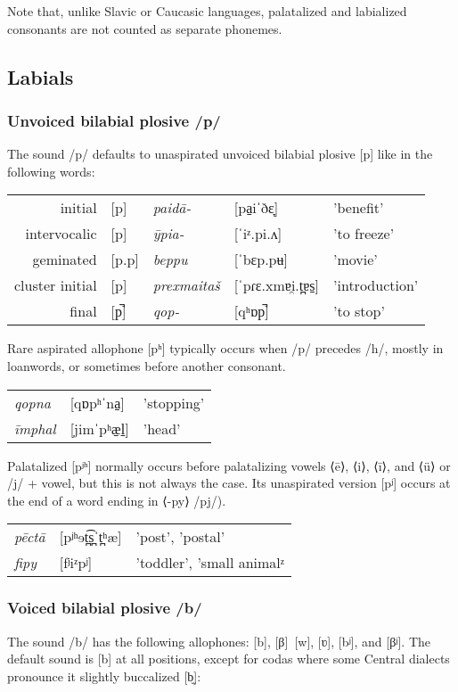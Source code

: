 Note that, unlike Slavic or Caucasic languages, palatalized and labialized consonants are not counted as separate phonemes.

\subsection{Labials}

\subsubsection{Unvoiced bilabial plosive /p/}
The sound /p/ defaults to unaspirated unvoiced bilabial plosive [p] like in the following words:

\begin{tabular}{rllll}
initial         & {[}p{]}  & \textit{paidā-}     & {[}pa̠iˈðɛ̞{]}        & 'benefit'      \\
intervocalic    & {[}p{]}  & \textit{ȳpia-}      & {[}ˈiᶻ.pi.ʌ{]}        & 'to freeze'    \\
geminated       & {[}p.p{]}  & \textit{beppu}      & {[}ˈbɛp.pʉ{]}         & 'movie'        \\
cluster initial & {[}p{]}  & \textit{prexmaitaš} & {[}ˈpɾɛ.xmɐi̯.t̪ɐs̠{]} & 'introduction' \\
final           & {[}p̚{]} & \textit{qop-}       & {[}qʰɒp̚{]}           & 'to stop'     
\end{tabular}


Rare aspirated allophone [pʰ] typically occurs when /p/ precedes /h/, mostly in loanwords, or sometimes before another consonant.


\begin{tabular}{lll}
\textit{qopna}  & {[}qɒpʰˈna̠{]}   & 'stopping' \\
\textit{īmphal} & {[}jimˈpʰæ̠l̠{]} & 'head'    
\end{tabular}


Palatalized [pʲʰ] normally occurs before palatalizing vowels ⟨ē⟩, ⟨i⟩, ⟨ī⟩, and ⟨ü⟩ or /j/ + vowel, but this is not always the case. Its unaspirated version [pʲ] occurs at the end of a word ending in ⟨-py⟩ /pj/).


\begin{tabular}{lll}
\textit{pēctā} & {[}pʲʰɘt̪͡s̪ˈt̪ʰæ{]} & 'post', 'postal'          \\
\textit{fipy}  & {[}fʲiᶻpʲ{]}          & 'toddler', 'small animalᶻ
\end{tabular}

\subsubsection{Voiced bilabial plosive /b/}
The sound /b/ has the following allophones: [b], [β]~[w], [ʋ], [bʲ], and [βʲ]. The default sound is [b] at all positions, except for codas where some Central dialects pronounce it slightly buccalized [b̫]:

